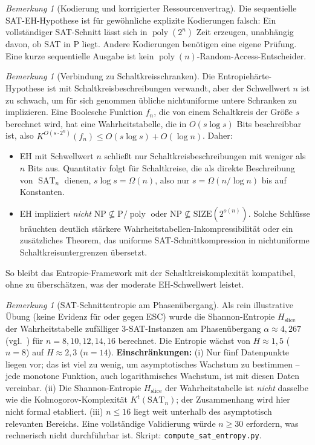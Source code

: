 \documentclass[aps,prd,twocolumn,superscriptaddress,nofootinbib]{revtex4-2}
\theoremstyle{definition}
\theoremstyle{remark}
\newtheorem{remark}[theorem]{Bemerkung}
\DeclareMathOperator{\poly}{poly}
\DeclareMathOperator{\SAT}{SAT}
\newcommand{\NP}{\mathrm{NP}}
\newcommand{\PP}{\mathrm{P}}
\begin{document}
\begin{remark}[Kodierung und korrigierter Ressourcenvertrag]
\label{rem:encoding}
Die sequentielle SAT-EH-Hypothese ist für gewöhnliche explizite
Kodierungen falsch: Ein vollständiger SAT-Schnitt lässt sich
in $\poly(2^n)$ Zeit erzeugen, unabhängig davon, ob SAT in $\PP$ liegt.
Andere Kodierungen benötigen eine eigene Prüfung. Eine kurze
sequentielle Ausgabe ist kein $\poly(n)$-Random-Access-Entscheider.
\end{remark}

\begin{remark}[Verbindung zu Schaltkreisschranken]
\label{rem:circuit-connection}
Die Entropiehärte-Hypothese ist mit Schaltkreisbeschreibungen verwandt, aber der Schwellwert $n$ ist zu schwach, um für sich genommen übliche nichtuniforme untere Schranken zu implizieren. Eine Boolesche Funktion $f_n$, die von einem Schaltkreis der Größe $s$ berechnet wird, hat eine Wahrheitstabelle, die in $O(s \log s)$ Bits beschreibbar ist, also $K^{O(s \cdot 2^n)}(f_n) \leq O(s \log s) + O(\log n)$. Daher:
\begin{itemize}
\item EH mit Schwellwert $n$ schließt nur Schaltkreisbeschreibungen mit weniger als $n$ Bits aus. Quantitativ folgt für Schaltkreise, die als direkte Beschreibung von $\SAT_n$ dienen, $s\log s=\Omega(n)$, also nur $s=\Omega(n/\log n)$ bis auf Konstanten.
\item EH impliziert \emph{nicht} $\NP \not\subseteq \PP/\poly$ oder $\NP \not\subseteq \mathrm{SIZE}(2^{o(n)})$. Solche Schlüsse bräuchten deutlich stärkere Wahrheitstabellen-Inkompressibilität oder ein zusätzliches Theorem, das uniforme SAT-Schnittkompression in nichtuniforme Schaltkreisuntergrenzen übersetzt.
\end{itemize}
So bleibt das Entropie-Framework mit der Schaltkreiskomplexität kompatibel, ohne zu überschätzen, was der moderate EH-Schwellwert leistet.
\end{remark}

\begin{remark}[SAT-Schnittentropie am Phasenübergang]
\label{rem:sat-entropy}
Als rein illustrative Übung (keine Evidenz für oder gegen ESC) wurde die Shannon-Entropie $H_{\mathrm{slice}}$ der Wahrheitstabelle zufälliger 3-SAT-Instanzen am Phasenübergang $\alpha \approx 4{,}267$ (vgl.~\cite{Monasson1999,MezardZecchina2002,AchlioptasRicci2006}) für $n = 8, 10, 12, 14, 16$ berechnet. Die Entropie wächst von $H \approx 1{,}5$ ($n=8$) auf $H \approx 2{,}3$ ($n=14$). \textbf{Einschränkungen:} (i) Nur fünf Datenpunkte liegen vor; das ist viel zu wenig, um asymptotisches Wachstum zu bestimmen -- jede monotone Funktion, auch logarithmisches Wachstum, ist mit diesen Daten vereinbar. (ii) Die Shannon-Entropie $H_{\mathrm{slice}}$ der Wahrheitstabelle ist \emph{nicht} dasselbe wie die Kolmogorov-Komplexität $K^t(\mathrm{SAT}_n)$; der Zusammenhang wird hier nicht formal etabliert. (iii) $n \leq 16$ liegt weit unterhalb des asymptotisch relevanten Bereichs. Eine vollständige Validierung würde $n \geq 30$ erfordern, was rechnerisch nicht durchführbar ist. Skript: \texttt{compute\_sat\_entropy.py}.
\end{remark}
\end{document}
